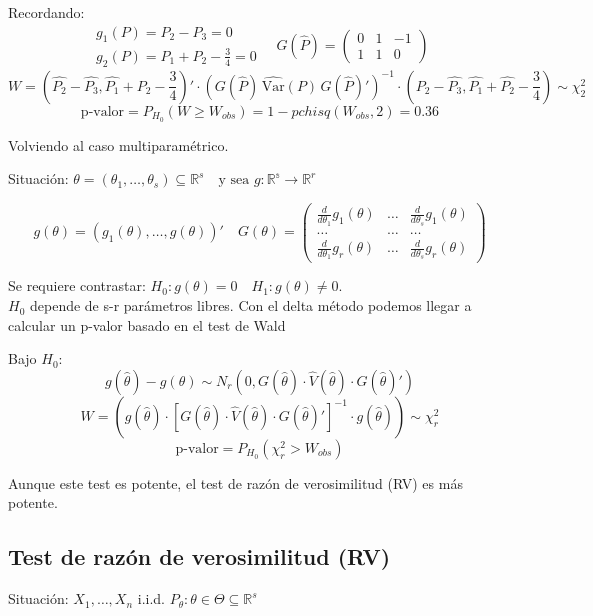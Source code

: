 Recordando:   
\[
\begin{matrix}
    g_1(P)=P_2-P_3=0 \\
    g_2(P)=P_1+P_2-\frac{3}{4}=0
\end{matrix}
\quad
G(\hat{P})=
\begin{pmatrix}
    0 & 1 & -1\\
    1 & 1 & 0
\end{pmatrix}
\]
\[
W = \left( \hat{P_2}-\hat{P_3}, \hat{P_1}+\hat{P_2}-\frac{3}{4} \right)' \cdot \left( G(\hat{P}) \, \hat{\text{Var}}(P) \, G(\hat{P})' \right)^{-1} \cdot 
\left(  \hat{P_2}-\hat{P_3}, \hat{P_1}+\hat{P_2}-\frac{3}{4} \right) \sim \chi^2_2 
\]
\[
\text{p-valor}=P_{H_0}(W \geq W_{obs})=1-pchisq(W_{obs},2)=0.36
\]

Volviendo al caso multiparamétrico.

Situación: $\theta=(\theta_1,\dots,\theta_s) \subseteq \mathbb{R}^s \quad \text{y sea }g:\mathbb{R^s}\to \mathbb{R}^r$

\[
g(\theta)=(g_1(\theta),\dots,g(\theta))'
\quad G(\theta)=
\begin{pmatrix}
    \frac{d}{d \theta_1} g_1(\theta) & \dots &  \frac{d}{d \theta_s} g_1(\theta) \\
    \dots & \dots & \dots \\
    \frac{d}{d \theta_1} g_r(\theta) & \dots &  \frac{d}{d \theta_s} g_r(\theta)
\end{pmatrix}
\]

Se requiere contrastar: $H_0:g(\theta)=0 \quad H_1:g(\theta) \neq 0$.
\\ $H_0$ depende de s-r parámetros libres. Con el delta método podemos llegar a calcular un p-valor basado en el test de Wald

Bajo $H_0$:
\[
g(\hat{\theta})-g(\theta) \sim N_r(0,G(\hat{\theta})\cdot \hat{V}(\hat{\theta})\cdot G(\hat{\theta})')
\]
\[
W=(g(\hat{\theta})\cdot [G(\hat{\theta})\cdot \hat{V}(\hat{\theta})\cdot G(\hat{\theta})']^{-1} \cdot g(\hat{\theta})) \sim \chi^2_r
\]
\[
\text{p-valor}=P_{H_0}(\chi^2_r>W_{obs})
\]

Aunque este test es potente, el test de razón de verosimilitud (RV) es más potente.

\subsection{Test de razón de verosimilitud (RV)}

Situación: $X_1,\dots,X_n$ i.i.d. $P_\theta:\theta \in \Theta \subseteq \mathbb{R}^s$

